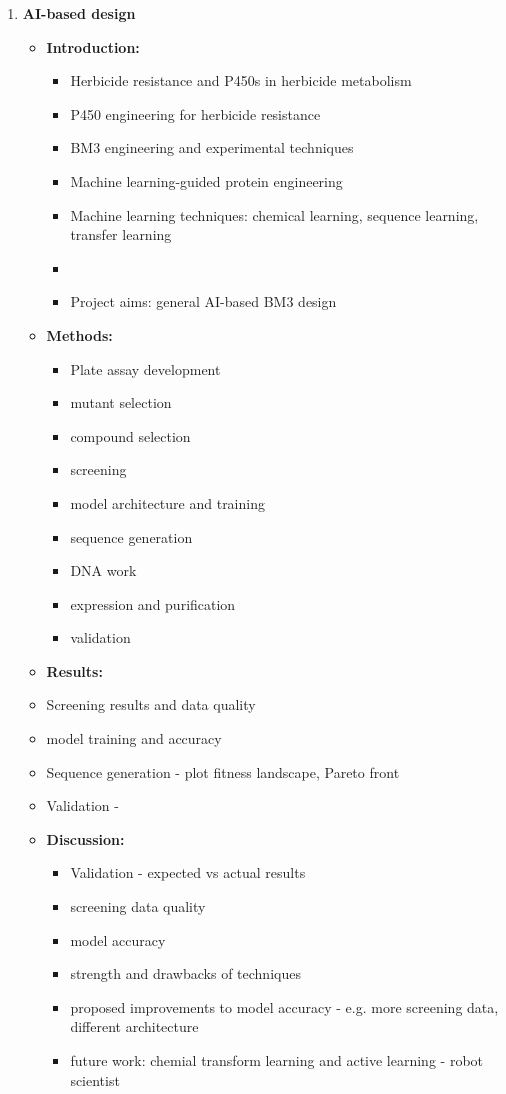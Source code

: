 \documentclass{article}
\begin{document}
\begin{enumerate}
\begin{itemize}
		\end{itemize}
	\item \textbf{AI-based design}
		\begin{itemize}
			\item \textbf{Introduction:}
				\begin{itemize}
					\item Herbicide resistance and P450s in herbicide metabolism
					\item P450 engineering for herbicide resistance
					\item BM3 engineering and experimental techniques
					\item Machine learning-guided protein engineering 
					\item Machine learning techniques: chemical learning, sequence learning, transfer learning
					\item 
					\item Project aims: general AI-based BM3 design
				\end{itemize}
			\item \textbf{Methods:}
				\begin{itemize}
					\item Plate assay development 
					\item mutant selection 
					\item compound selection 
					\item screening 
					\item model architecture and training
					\item sequence generation
					\item DNA work
					\item expression and purification 
					\item validation
				\end{itemize}
			\item \textbf{Results:}
				\item Screening results and data quality
				\item model training and accuracy
				\item Sequence generation - plot fitness landscape, Pareto front 
				\item Validation - 
			\item \textbf{Discussion:}
				\begin{itemize}
					\item Validation - expected vs actual results
					\item screening data quality
					\item model accuracy
					\item strength and drawbacks of techniques 
					\item proposed improvements to model accuracy - e.g. more screening data, different architecture 
					\item future work: chemial transform learning and active learning - robot scientist
				\end{itemize}
		\end{itemize}
\end{enumerate}
\end{document}
